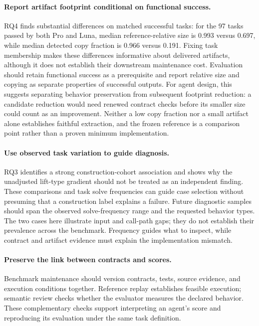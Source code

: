 \documentclass[acmsmall,screen,review,anonymous,nonacm]{acmart}
\begin{document}
\paragraph{Report artifact footprint conditional on functional success.}
RQ4 finds substantial differences on matched successful tasks: for the 97 tasks
passed by both Pro and Luna, median reference-relative size is 0.993 versus
0.697, while median detected copy fraction is 0.966 versus 0.191. Fixing task
membership makes these differences informative about delivered artifacts,
although it does not establish their downstream maintenance cost. Evaluation
should retain functional success as a prerequisite and report relative size and
copying as separate properties of successful outputs. For agent design, this
suggests separating behavior preservation from subsequent footprint reduction:
a candidate reduction would need renewed contract checks before its smaller
size could count as an improvement. Neither a low copy fraction nor a small
artifact alone establishes faithful extraction, and the frozen reference is a
comparison point rather than a proven minimum implementation.

\paragraph{Use observed task variation to guide diagnosis.}
RQ3 identifies a strong construction-cohort association and shows why the
unadjusted lift-type gradient should not be treated as an independent finding.
These comparisons and task solve frequencies can guide case selection without
presuming that a construction label explains a failure. Future diagnostic samples should
span the observed solve-frequency range and the requested behavior types.
The two cases here illustrate input and call-path gaps; they do not establish
their prevalence across the benchmark. Frequency guides what to inspect,
while contract and artifact evidence must explain the implementation mismatch.

\paragraph{Preserve the link between contracts and scores.}
Benchmark maintenance should version contracts, tests, source evidence, and
execution conditions together. Reference replay establishes feasible execution;
semantic review checks whether the evaluator measures the declared behavior.
These complementary checks support interpreting an agent's score and reproducing
its evaluation under the same task definition.
\end{document}
